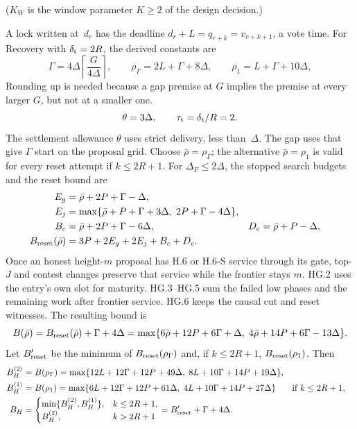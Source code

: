 \documentclass{article}
\theoremstyle{plain}
\theoremstyle{definition}
\theoremstyle{remark}
\begin{document}
($K_W$ is the window parameter $K\geq2$ of the design decision.)

A lock written at~$d_r$ has the deadline $d_r+L=q_{r+k}=v_{r+k+1}$, a
vote time.  For Recovery with $\delta_{\rm t}=2R$,
the derived constants are~\cite[H.6--H.11, HG.1--HG.6, H.20]{BPH}
\[
 \Gamma=4\Delta\left\lceil\frac{G}{4\Delta}\right\rceil,\qquad
 \rho_\Gamma=2L+\Gamma+8\Delta,\qquad \rho_1=L+\Gamma+10\Delta,
\]
Rounding up is needed because a gap premise at $G$ implies the premise at every larger $G$, but not at a smaller one.
\[
 \theta=3\Delta,\qquad \tau_{\rm t}=\delta_{\rm t}/R=2.
\]
The settlement allowance $\theta$ uses strict delivery, less
than~$\Delta$.  The gap uses that give $\Gamma$ start on the proposal
grid.  Choose $\bar\rho=\rho_\Gamma$; the alternative
$\bar\rho=\rho_1$ is valid for every reset attempt if $k\leq2R+1$.
For $\Delta_F\leq2\Delta$, the stopped search budgets and the reset bound are
\begin{align*}
 E_g&=\bar\rho+2P+\Gamma-\Delta,\\
 E_j&=\max\{\bar\rho+P+\Gamma+3\Delta,\;2P+\Gamma-4\Delta\},\\
 B_c&=\bar\rho+2P+\Gamma-6\Delta,&
 D_c&=\bar\rho+P-\Delta,\\
 B_{\rm reset}(\bar\rho)&=3P+2E_g+2E_j+B_c+D_c.
\end{align*}
Once an honest height-$m$ proposal has H.6 or H.6-S service through
its gate, top-$J$ and contest changes preserve that service while the
frontier stays $m$.  HG.2 uses the entry's own slot for maturity.
HG.3--HG.5 sum the failed low phases and the remaining work after
frontier service.  HG.6 keeps the causal cut and reset witnesses.
The resulting bound is
\[
 B(\bar\rho)=B_{\rm reset}(\bar\rho)+\Gamma+4\Delta
 =\max\{6\bar\rho+12P+6\Gamma+\Delta,\;
         4\bar\rho+14P+6\Gamma-13\Delta\}.
\]
Let $B'_{\rm reset}$ be the minimum of $B_{\rm reset}(\rho_\Gamma)$
and, if $k\leq2R+1$, $B_{\rm reset}(\rho_1)$.  Then
\begin{align*}
 B_H^{(2)}&=B(\rho_\Gamma)
 =\max\{12L+12\Gamma+12P+49\Delta,\;8L+10\Gamma+14P+19\Delta\},\\
 B_H^{(1)}&=B(\rho_1)
 =\max\{6L+12\Gamma+12P+61\Delta,\;4L+10\Gamma+14P+27\Delta\}
       &&\text{if }k\leq2R+1,\\
 B_H&=\begin{cases}
   \min\{B_H^{(2)},B_H^{(1)}\},&k\leq2R+1,\\
   B_H^{(2)},&k>2R+1
  \end{cases}
  =B'_{\rm reset}+\Gamma+4\Delta.
\end{align*}
\end{document}
